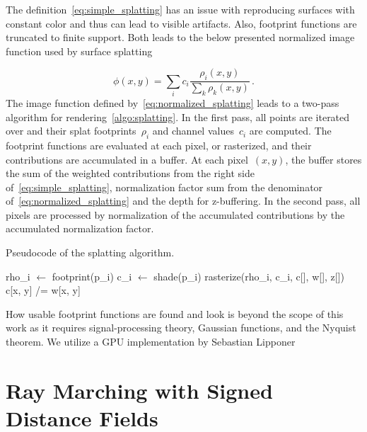 The definition~\cref{eq:simple_splatting} has an issue with reproducing surfaces with constant color and thus can
lead to visible artifacts. Also, footprint functions are truncated to finite support. Both leads to the below presented
normalized image function used by surface splatting

\begin{equation}\label{eq:normalized_splatting}
\phi(x, y) = \sum_i c_i\frac{\rho_i(x, y)}{\sum_k \rho_k(x, y)}\,.
\end{equation}
The image function defined by~\cref{eq:normalized_splatting} leads to a two-pass algorithm for
rendering~\cref{algo:splatting}. In the first pass, all points are iterated over and their splat
footprints~$\rho_i$ and channel values~$c_i$ are computed. The footprint functions are evaluated at each pixel, or
rasterized, and their contributions are accumulated in a buffer. At each pixel~$(x, y)$,
the buffer stores the sum of the weighted contributions from the right side of~\cref{eq:simple_splatting},
normalization factor sum from the denominator of~\cref{eq:normalized_splatting} and the depth for z-buffering.
In the second pass, all pixels are processed by normalization of the accumulated contributions by the accumulated
normalization factor.

\begin{algorithm}[t]
	\caption{Pseudocode of the splatting algorithm.}\label{algo:splatting}
	\begin{algorithmic}[1]
					\State rho\_i $\gets$ footprint(p\_i)
					\State c\_i $\gets$ shade(p\_i)
                        \State rasterize(rho\_i, c\_i, c[], w[], z[])
			\EndFor
                        \State c[x, y] /= w[x, y]
			\EndFor
		\EndProcedure
	\end{algorithmic}
\end{algorithm}

How usable footprint functions are found and look is beyond the scope of this work as it requires
signal-processing theory, Gaussian functions, and the Nyquist theorem. We utilize
a GPU implementation by Sebastian Lipponer

\section{Ray Marching with Signed Distance Fields}

